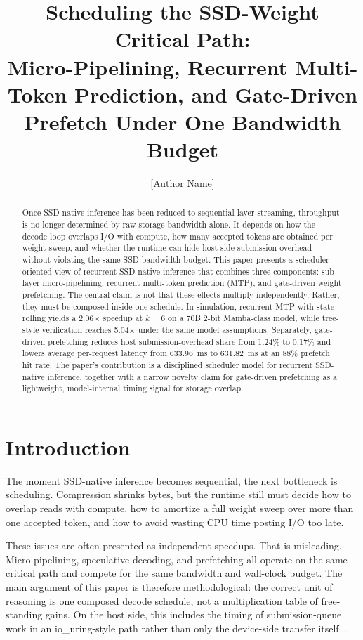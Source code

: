 \documentclass[11pt]{article}
\title{Scheduling the SSD-Weight Critical Path:\\Micro-Pipelining, Recurrent Multi-Token Prediction, and Gate-Driven Prefetch Under One Bandwidth Budget}
\author{[Author Name]}
\date{}
\begin{document}
\maketitle

\begin{abstract}
Once SSD-native inference has been reduced to sequential layer streaming, throughput is no longer determined by raw storage bandwidth alone. It depends on how the decode loop overlaps I/O with compute, how many accepted tokens are obtained per weight sweep, and whether the runtime can hide host-side submission overhead without violating the same SSD bandwidth budget. This paper presents a scheduler-oriented view of recurrent SSD-native inference that combines three components: sub-layer micro-pipelining, recurrent multi-token prediction (MTP), and gate-driven weight prefetching. The central claim is not that these effects multiply independently. Rather, they must be composed inside one schedule. In simulation, recurrent MTP with state rolling yields a 2.06$\times$ speedup at $k=6$ on a 70B 2-bit Mamba-class model, while tree-style verification reaches 5.04$\times$ under the same model assumptions. Separately, gate-driven prefetching reduces host submission-overhead share from 1.24\% to 0.17\% and lowers average per-request latency from 633.96~ms to 631.82~ms at an 88\% prefetch hit rate. The paper's contribution is a disciplined scheduler model for recurrent SSD-native inference, together with a narrow novelty claim for gate-driven prefetching as a lightweight, model-internal timing signal for storage overlap.
\end{abstract}

\section{Introduction}
The moment SSD-native inference becomes sequential, the next bottleneck is scheduling. Compression shrinks bytes, but the runtime still must decide how to overlap reads with compute, how to amortize a full weight sweep over more than one accepted token, and how to avoid wasting CPU time posting I/O too late.

These issues are often presented as independent speedups. That is misleading. Micro-pipelining, speculative decoding, and prefetching all operate on the same critical path and compete for the same bandwidth and wall-clock budget. The main argument of this paper is therefore methodological: the correct unit of reasoning is one composed decode schedule, not a multiplication table of free-standing gains. On the host side, this includes the timing of submission-queue work in an io\_uring-style path rather than only the device-side transfer itself~\cite{io_uring}.
\end{document}
